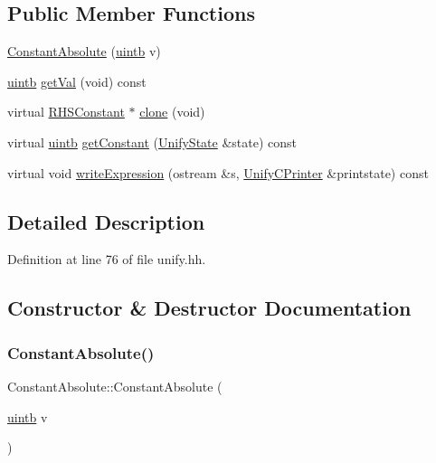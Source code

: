 \subsection*{Public Member Functions}
\begin{DoxyCompactItemize}
\item 
\mbox{\hyperlink{class_constant_absolute_a08cfb1053deedf291aed99b0510a7e31}{Constant\+Absolute}} (\mbox{\hyperlink{types_8h_a2db313c5d32a12b01d26ac9b3bca178f}{uintb}} v)
\item 
\mbox{\hyperlink{types_8h_a2db313c5d32a12b01d26ac9b3bca178f}{uintb}} \mbox{\hyperlink{class_constant_absolute_a426b1b76e07a9142110884947c20ff5c}{get\+Val}} (void) const
\item 
virtual \mbox{\hyperlink{class_r_h_s_constant}{R\+H\+S\+Constant}} $\ast$ \mbox{\hyperlink{class_constant_absolute_abc264546b0dde5e9c02777367aa00424}{clone}} (void)
\item 
virtual \mbox{\hyperlink{types_8h_a2db313c5d32a12b01d26ac9b3bca178f}{uintb}} \mbox{\hyperlink{class_constant_absolute_ae393b6b03f852d82b28c8bf29ea094c2}{get\+Constant}} (\mbox{\hyperlink{class_unify_state}{Unify\+State}} \&state) const
\item 
virtual void \mbox{\hyperlink{class_constant_absolute_a137b56bbc65f682cefb1b997dd993dc8}{write\+Expression}} (ostream \&s, \mbox{\hyperlink{class_unify_c_printer}{Unify\+C\+Printer}} \&printstate) const
\end{DoxyCompactItemize}


\subsection{Detailed Description}


Definition at line 76 of file unify.\+hh.



\subsection{Constructor \& Destructor Documentation}
\mbox{\label{class_constant_absolute_a08cfb1053deedf291aed99b0510a7e31}} 
\subsubsection{\texorpdfstring{ConstantAbsolute()}{ConstantAbsolute()}}
{\footnotesize\ttfamily Constant\+Absolute\+::\+Constant\+Absolute (\begin{DoxyParamCaption}\item[{\mbox{\hyperlink{types_8h_a2db313c5d32a12b01d26ac9b3bca178f}{uintb}}}]{v }\end{DoxyParamCaption})\hspace{0.3cm}{\ttfamily [inline]}}



